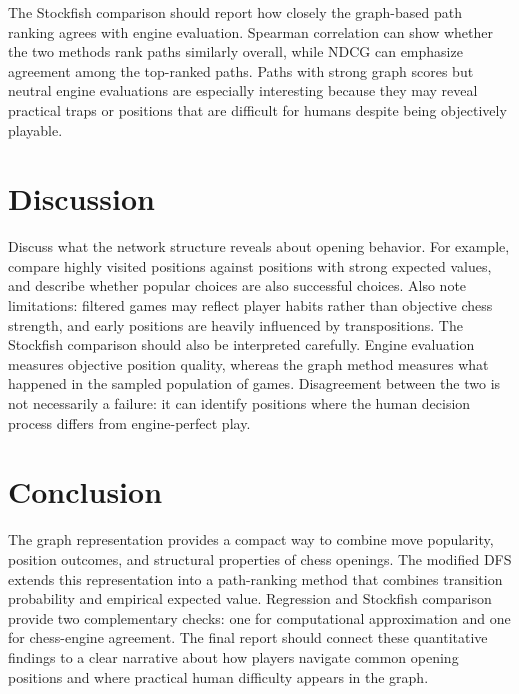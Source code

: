 \documentclass[11pt,a4paper]{article}
\begin{document}
The Stockfish comparison should report how closely the graph-based path ranking agrees with engine evaluation.
Spearman correlation can show whether the two methods rank paths similarly overall, while NDCG can emphasize agreement among the top-ranked paths.
Paths with strong graph scores but neutral engine evaluations are especially interesting because they may reveal practical traps or positions that are difficult for humans despite being objectively playable.

\section{Discussion}

Discuss what the network structure reveals about opening behavior.
For example, compare highly visited positions against positions with strong expected values, and describe whether popular choices are also successful choices.
Also note limitations: filtered games may reflect player habits rather than objective chess strength, and early positions are heavily influenced by transpositions.
The Stockfish comparison should also be interpreted carefully.
Engine evaluation measures objective position quality, whereas the graph method measures what happened in the sampled population of games.
Disagreement between the two is not necessarily a failure: it can identify positions where the human decision process differs from engine-perfect play.

\section{Conclusion}

The graph representation provides a compact way to combine move popularity, position outcomes, and structural properties of chess openings.
The modified DFS extends this representation into a path-ranking method that combines transition probability and empirical expected value.
Regression and Stockfish comparison provide two complementary checks: one for computational approximation and one for chess-engine agreement.
The final report should connect these quantitative findings to a clear narrative about how players navigate common opening positions and where practical human difficulty appears in the graph.



\end{document}
